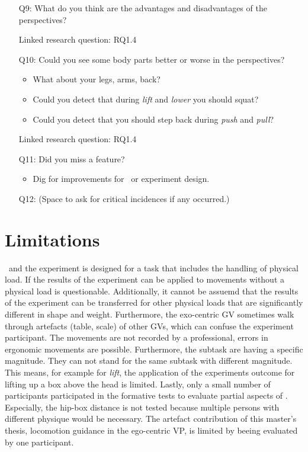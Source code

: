 \begin{itemize}
	\item[Q9:] What do you think are the advantages and disadvantages of the perspectives?
	\item[] Linked research question: RQ1.4
	
	\item[Q10:] Could you see some body parts better or worse in the perspectives?
	\begin{itemize}
		\item What about your legs, arms, back?
		\item Could you detect that during \textit{lift} and \textit{lower} you should squat?
		\item Could you detect that you should step back during \textit{push} and \textit{pull}?
	\end{itemize}
	\item[] Linked research question: RQ1.4
	
	\item[Q11:] Did you miss a feature?
	\begin{itemize}
		\item Dig for improvements for \exgo\ or experiment design.
	\end{itemize}
	
	\item[Q12:] (Space to ask for critical incidences if any occurred.)
\end{itemize}

\section{Limitations}
\label{sec:limitations}
\exgo\ and the experiment is designed for a task that includes the handling of physical load. If the results of the experiment can be applied to movements without a physical load is questionable. Additionally, it cannot be assuemd that the results of the experiment can be transferred for other physical loads that are significantly different in shape and weight. Furthermore, the exo-centric GV sometimes walk through artefacts (table, scale) of other GVs, which can confuse the experiment participant. The movements are not recorded by a professional, errors in ergonomic movements are possible. Furthermore, the subtask are having a specific magnitude. They can not stand for the same subtask with different magnitude. This means, for example for \textit{lift}, the application of the experiments outcome for lifting up a box above the head is limited. Lastly, only a small number of participants participated in the formative tests to evaluate partial aspects of \exgo. Especially, the hip-box distance is not tested because multiple persons with different physique would be necessary. The artefact contribution of this master's thesis, locomotion guidance in the ego-centric VP, is limited by beeing evaluated by one participant.\\

